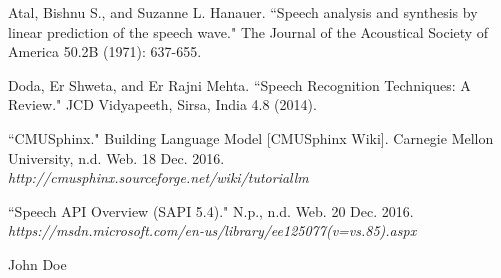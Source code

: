 \documentclass[conference]{IEEEtran}
\begin{document}
\begin{thebibliography}{1}
Atal, Bishnu S., and Suzanne L. Hanauer. ``Speech analysis and synthesis by linear prediction of the speech wave." The Journal of the Acoustical Society of America 50.2B (1971): 637-655.

Doda, Er Shweta, and Er Rajni Mehta. ``Speech Recognition Techniques: A Review." JCD Vidyapeeth, Sirsa, India 4.8 (2014).

``CMUSphinx." Building Language Model [CMUSphinx Wiki]. Carnegie Mellon University, n.d. Web. 18 Dec. 2016. \emph{http://cmusphinx.sourceforge.net/wiki/tutoriallm}


``Speech API Overview (SAPI 5.4)." N.p., n.d. Web. 20 Dec. 2016. \emph{https://msdn.microsoft.com/en-us/library/ee125077(v=vs.85).aspx}


\end{thebibliography}

% 

\begin{IEEEbiography}{John Doe}
\blindtext
\end{IEEEbiography}






\end{document}
